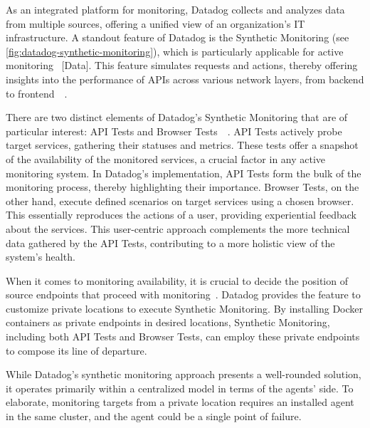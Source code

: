 As an integrated platform for monitoring, Datadog collects and analyzes data from multiple sources, offering a unified view of an organization's IT infrastructure. A standout feature of Datadog is the Synthetic Monitoring (see \autoref{fig:datadog-synthetic-monitoring}), which is particularly applicable for active monitoring~\parencite{datadogSyntheticMonitoring} [Data]. This feature simulates requests and actions, thereby offering insights into the performance of APIs across various network layers, from backend to frontend~\parencite{datadogAPITests}~\parencite{datadogBrowserTests}. 

There are two distinct elements of Datadog's Synthetic Monitoring that are of particular interest: API Tests and Browser Tests~\parencite{datadogAPITests}~\parencite{datadogBrowserTests}. API Tests actively probe target services, gathering their statuses and metrics. These tests offer a snapshot of the availability of the monitored services, a crucial factor in any active monitoring system. In Datadog's implementation, API Tests form the bulk of the monitoring process, thereby highlighting their importance. Browser Tests, on the other hand, execute defined scenarios on target services using a chosen browser. This essentially reproduces the actions of a user, providing experiential feedback about the services. This user-centric approach complements the more technical data gathered by the API Tests, contributing to a more holistic view of the system's health. 

When it comes to monitoring availability, it is crucial to decide the position of source endpoints that proceed with monitoring~\parencite{datadogRunSyntheticTests}. Datadog provides the feature to customize private locations to execute Synthetic Monitoring. By installing Docker containers as private endpoints in desired locations, Synthetic Monitoring, including both API Tests and Browser Tests, can employ these private endpoints to compose its line of departure. 

While Datadog's synthetic monitoring approach presents a well-rounded solution, it operates primarily within a centralized model in terms of the agents' side. To elaborate, monitoring targets from a private location requires an installed agent in the same cluster, and the agent could be a single point of failure. 